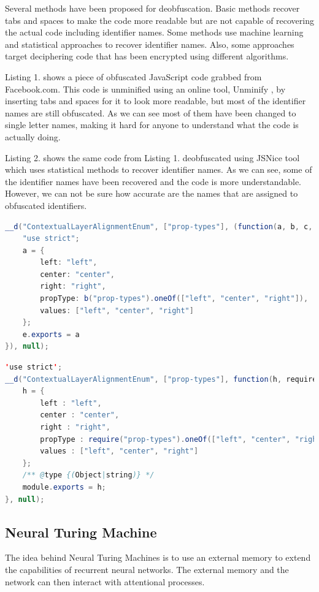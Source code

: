 \documentclass[acmsmall]{acmart}
\begin{document}
Several methods have been proposed for deobfuscation. Basic methods recover tabs and spaces to make the code more readable but are not capable of recovering the actual code including identifier names. Some methods use machine learning and statistical approaches to recover identifier names. Also, some approaches target deciphering code that has been encrypted using different algorithms.

Listing 1. shows a piece of obfuscated JavaScript code grabbed from Facebook.com. This code is unminified using an online tool, Unminify \cite{unminify}, by inserting tabs and spaces for it to look more readable, but most of the identifier names are still obfuscated. As we can see most of them have been changed to single letter names, making it hard for anyone to understand what the code is actually doing.

Listing 2. shows the same code from Listing 1. deobfuscated using JSNice \cite{jsnice} tool which uses statistical methods to recover identifier names. As we can see, some of the identifier names have been recovered and the code is more understandable. However, we can not be sure how accurate are the names that are assigned to obfuscated identifiers.

\begin{lstlisting}[language=Java,caption={An obfuscated JavaScript code from facebook.com}]
__d("ContextualLayerAlignmentEnum", ["prop-types"], (function(a, b, c, d, e, f) {
	"use strict";
	a = {
		left: "left",
		center: "center",
		right: "right",
		propType: b("prop-types").oneOf(["left", "center", "right"]),
		values: ["left", "center", "right"]
	};
	e.exports = a
}), null);
\end{lstlisting}

\begin{lstlisting}[language=Java,caption={Deobfuscated JavaScript code from Listing 1. using JsNice\cite{jsnice} tool}]
'use strict';
__d("ContextualLayerAlignmentEnum", ["prop-types"], function(h, require, canCreateDiscussions, isSlidingUp, module, dontForceConstraints) {
	h = {
		left : "left",
		center : "center",
		right : "right",
		propType : require("prop-types").oneOf(["left", "center", "right"]),
		values : ["left", "center", "right"]
	};
	/** @type {(Object|string)} */
	module.exports = h;
}, null);
\end{lstlisting}




\subsection{Neural Turing Machine}
The idea behind Neural Turing Machines is to use an external memory to extend the capabilities of recurrent neural networks. The external memory and the network can then interact with attentional processes.
\end{document}
